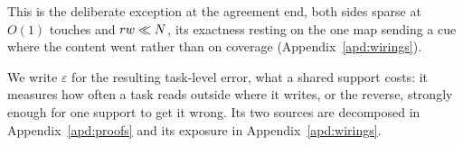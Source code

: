 This is the deliberate exception at the agreement end, both sides sparse at $O(1)$ touches and $r w \ll N$, its exactness resting on the one map sending a cue where the content went rather than on coverage (Appendix~\ref{apd:wirings}).



We write $\varepsilon$ for the resulting task-level error, what a shared support costs: it measures how often a task reads outside where it writes, or the reverse, strongly enough for one support to get it wrong. Its two sources are decomposed in Appendix~\ref{apd:proofs} and its exposure in Appendix~\ref{apd:wirings}.

